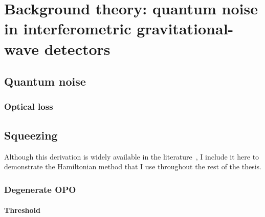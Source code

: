 \chapter{Background theory: quantum noise in interferometric gravitational-wave detectors}



\section{Quantum noise}


\subsection{Optical loss}



\section{Squeezing}



Although this derivation is widely available in the literature~\cite{}, I include it here to demonstrate the Hamiltonian method that I use throughout the rest of the thesis. 


\subsection{Degenerate OPO}


\subsubsection{Threshold}


